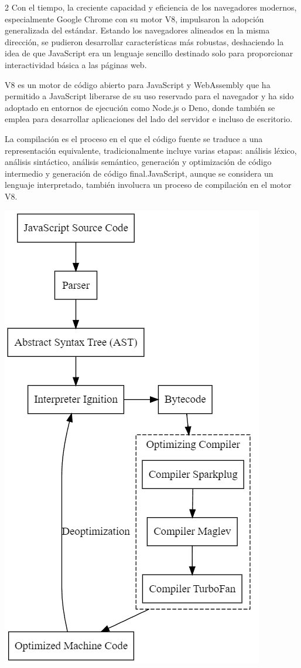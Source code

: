 \documentclass[12pt,spanish,Letterpaper,openany]{book}
\begin{document}
\begin {multicols}{2}
Con el tiempo, la creciente capacidad y eficiencia de los navegadores modernos, especialmente Google Chrome con su motor V8, impulsaron la adopción generalizada del estándar. Estando los navegadores alineados en la misma dirección, se pudieron desarrollar características más robustas, deshaciendo la idea de que JavaScript era un lenguaje sencillo destinado solo para proporcionar interactividad básica a las páginas web.

V8 es un motor de código abierto para JavaScript y WebAssembly que ha permitido a JavaScript liberarse de su uso reservado para el navegador y ha sido adoptado en entornos de ejecución como Node.js o Deno, donde también se emplea para desarrollar aplicaciones del lado del servidor e incluso de escritorio.

La compilación es el proceso en el que el código fuente se traduce a una representación equivalente, tradicionalmente incluye varias etapas: análisis léxico, análisis sintáctico, análisis semántico, generación y optimización de código intermedio y generación de código final.JavaScript, aunque se considera un lenguaje interpretado, también involucra un proceso de compilación en el motor V8.

\begin {flushleft}
\noindent\begin{minipage}[c]{\columnwidth}

\begin{center}\includegraphics[width=0.47\linewidth]{imagenes_articulos/sp66_01} \end{center}


\end{minipage}
\end{flushleft}
\end{multicols}
\end{document}
